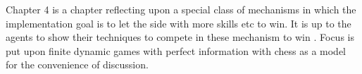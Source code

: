 Chapter 4 is a chapter reflecting upon a special class of mechanisms in which the implementation goal is to let the side with more skills etc to win. It is up to the agents to show their techniques to compete in these mechanism to win . Focus is put upon finite dynamic games with perfect information with chess as a model for the convenience of discussion.





